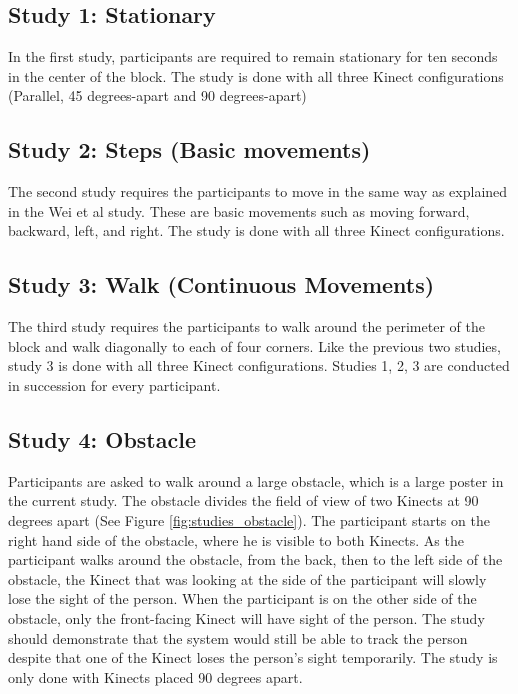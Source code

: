 \subsection{Study 1: Stationary}

In the first study, participants are required to remain stationary for ten seconds in the center of the block. The study is done with all three Kinect configurations (Parallel, 45 degrees-apart and 90 degrees-apart)

\subsection{Study 2: Steps (Basic movements)}

The second study requires the participants to move in the same way as explained in the Wei et al study. These are basic movements such as moving forward, backward, left, and right. The study is done with all three Kinect configurations.

\subsection{Study 3: Walk (Continuous Movements)}

The third study requires the participants to walk around the perimeter of the block and walk diagonally to each of four corners. Like the previous two studies, study 3 is done with all three Kinect configurations. Studies 1, 2, 3 are conducted in succession for every participant.

\subsection{Study 4: Obstacle}

Participants are asked to walk around a large obstacle, which is a large poster in the current study. The obstacle divides the field of view of two Kinects at 90 degrees apart (See Figure \ref{fig:studies_obstacle}). The participant starts on the right hand side of the obstacle, where he is visible to both Kinects. As the participant walks around the obstacle, from the back, then to the left side of the obstacle, the Kinect that was looking at the side of the participant will slowly lose the sight of the person. When the participant is on the other side of the obstacle, only the front-facing Kinect will have sight of the person. The study should demonstrate that the system would still be able to track the person despite that one of the Kinect loses the person's sight temporarily. The study is only done with Kinects placed 90 degrees apart.


